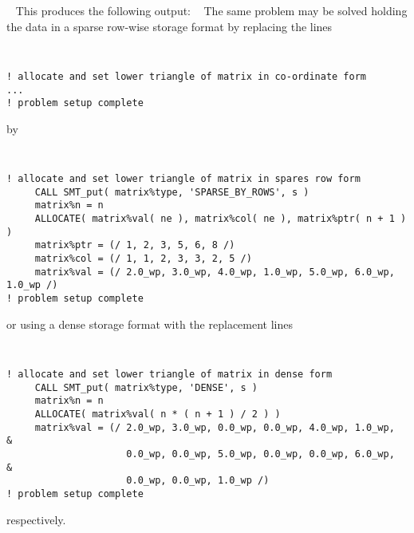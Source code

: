 \documentclass{galahad}
\begin{document}
{\tt \small
\VerbatimInput{\packageexample}
}
\noindent
This produces the following output:
{\tt \small
\VerbatimInput{\packageresults}
}
\noindent
The same problem may be solved holding the data in
a sparse row-wise storage format by replacing the lines
{\tt \small
\begin{verbatim}
! allocate and set lower triangle of matrix in co-ordinate form
...
! problem setup complete
\end{verbatim}
}
\noindent
by
{\tt \small
\begin{verbatim}
! allocate and set lower triangle of matrix in spares row form
     CALL SMT_put( matrix%type, 'SPARSE_BY_ROWS', s )
     matrix%n = n 
     ALLOCATE( matrix%val( ne ), matrix%col( ne ), matrix%ptr( n + 1 ) )
     matrix%ptr = (/ 1, 2, 3, 5, 6, 8 /)
     matrix%col = (/ 1, 1, 2, 3, 3, 2, 5 /)
     matrix%val = (/ 2.0_wp, 3.0_wp, 4.0_wp, 1.0_wp, 5.0_wp, 6.0_wp, 1.0_wp /)
! problem setup complete
\end{verbatim}
}
\noindent
or using a dense storage format with the replacement lines
{\tt \small
\begin{verbatim}
! allocate and set lower triangle of matrix in dense form
     CALL SMT_put( matrix%type, 'DENSE', s )
     matrix%n = n 
     ALLOCATE( matrix%val( n * ( n + 1 ) / 2 ) )
     matrix%val = (/ 2.0_wp, 3.0_wp, 0.0_wp, 0.0_wp, 4.0_wp, 1.0_wp,           &
                     0.0_wp, 0.0_wp, 5.0_wp, 0.0_wp, 0.0_wp, 6.0_wp,           &
                     0.0_wp, 0.0_wp, 1.0_wp /)
! problem setup complete
\end{verbatim}
}
\noindent
respectively.
\end{document}
